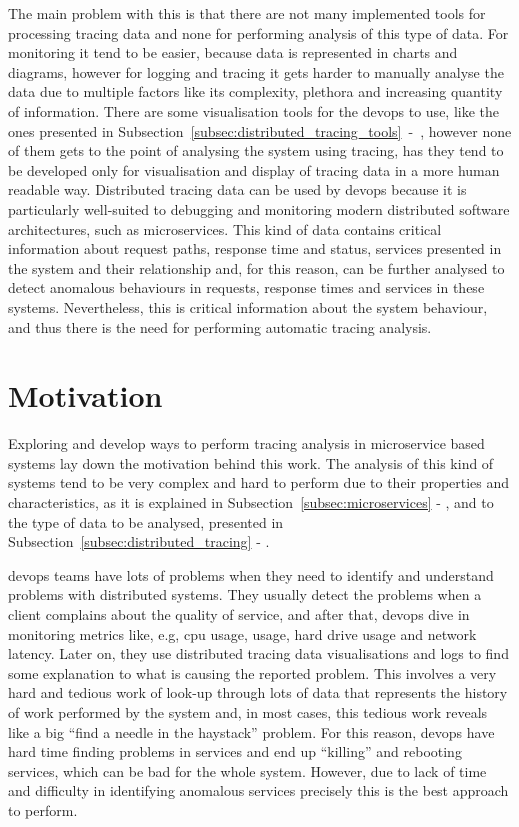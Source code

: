 The main problem with this is that there are not many implemented tools for processing tracing data and none for performing analysis of this type of data. For monitoring it tend to be easier, because data is represented in charts and diagrams, however for logging and tracing it gets harder to manually analyse the data due to multiple factors like its complexity, plethora and increasing quantity of information. There are some visualisation tools for the \gls{devops} to use, like the ones presented in Subsection~\ref{subsec:distributed_tracing_tools}~-~, however none of them gets to the point of analysing the system using tracing, has they tend to be developed only for visualisation and display of tracing data in a more human readable way. Distributed tracing data can be used by \gls{devops} because it is particularly well-suited to debugging and monitoring modern distributed software architectures, such as microservices. This kind of data contains critical information about request paths, response time and status, services presented in the system and their relationship and, for this reason, can be further analysed to detect anomalous behaviours in requests, response times and services in these systems. Nevertheless, this is critical information about the system behaviour, and thus there is the need for performing automatic tracing analysis.

\section{Motivation}
\label{sec:motivation}

Exploring and develop ways to perform tracing analysis in microservice based systems lay down the motivation behind this work. The analysis of this kind of systems tend to be very complex and hard to perform due to their properties and characteristics, as it is explained in Subsection~\ref{subsec:microservices} - , and to the type of data to be analysed, presented in Subsection~\ref{subsec:distributed_tracing} - .

\gls{devops} teams have lots of problems when they need to identify and understand problems with distributed systems. They usually detect the problems when a client complains about the quality of service, and after that, \gls{devops} dive in monitoring metrics like, e.g, \gls{cpu} usage, usage, hard drive usage and network latency. Later on, they use distributed tracing data visualisations and logs to find some explanation to what is causing the reported problem. This involves a very hard and tedious work of look-up through lots of data that represents the history of work performed by the system and, in most cases, this tedious work reveals like a big ``find a needle in the haystack'' problem. For this reason, \gls{devops} have hard time finding problems in services and end up ``killing'' and rebooting services, which can be bad for the whole system. However, due to lack of time and difficulty in identifying anomalous services precisely this is the best approach to perform.

